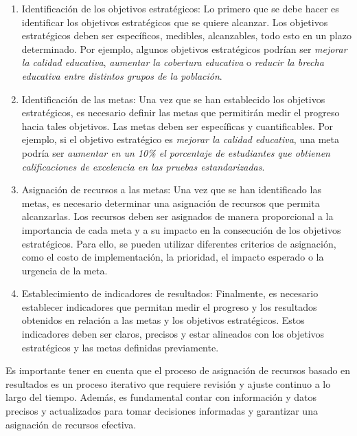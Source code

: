 \documentclass{article}
\begin{document}
\begin{multicols}{6}[]
\begin{enumerate}
	\item Identificaci\'on de los objetivos estrat\'egicos: Lo primero que se debe hacer es identificar los objetivos estrat\'egicos que se quiere alcanzar. Los objetivos estrat\'egicos deben ser espec\'ificos, medibles, alcanzables, todo esto en un plazo determinado. Por ejemplo, algunos objetivos estrat\'egicos podr\'ian ser \emph{mejorar la calidad educativa}, \emph{aumentar la cobertura educativa} o \emph{reducir la brecha educativa entre distintos grupos de la poblaci\'on}.

	\item Identificaci\'on de las metas: Una vez que se han establecido los objetivos estrat\'egicos, es necesario definir las metas que permitir\'an medir el progreso hacia tales objetivos. Las metas deben ser espec\'ificas y cuantificables. Por ejemplo, si el objetivo estrat\'egico es \emph{mejorar la calidad educativa}, una meta podr\'ia ser \emph{aumentar en un 10\% el porcentaje de estudiantes que obtienen calificaciones de excelencia en las pruebas estandarizadas}.

	\item Asignaci\'on de recursos a las metas: Una vez que se han identificado las metas, es necesario determinar una asignaci\'on de recursos que permita alcanzarlas. Los recursos deben ser asignados de manera proporcional a la importancia de cada meta y a su impacto en la consecuci\'on de los objetivos estrat\'egicos. Para ello, se pueden utilizar diferentes criterios de asignaci\'on, como el costo de implementaci\'on, la prioridad, el impacto esperado o la urgencia de la meta.

	\item Establecimiento de indicadores de resultados: Finalmente, es necesario establecer indicadores que permitan medir el progreso y los resultados obtenidos en relaci\'on a las metas y los objetivos estrat\'egicos. Estos indicadores deben ser claros, precisos y estar alineados con los objetivos estrat\'egicos y las metas definidas previamente.
\end{enumerate}

Es importante tener en cuenta que el proceso de asignaci\'on de recursos basado en resultados es un proceso iterativo que requiere revisi\'on y ajuste continuo a lo largo del tiempo. Adem\'as, es fundamental contar con informaci\'on y datos precisos y actualizados para tomar decisiones informadas y garantizar una asignaci\'on de recursos efectiva.


\end{multicols}
\end{document}
